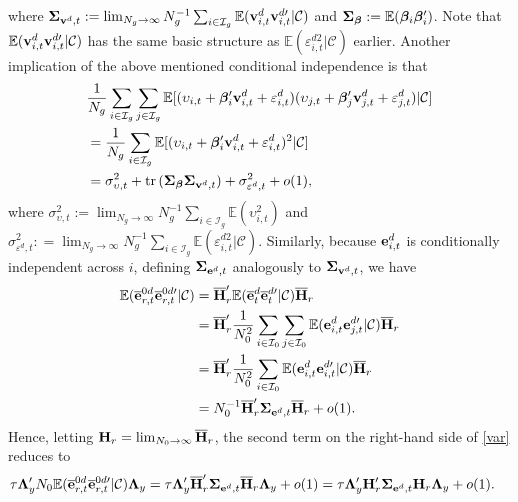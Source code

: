 \documentclass[12pt,fleqn]{article}
\begin{document}
where $\boldsymbol{\Sigma}_{\mathbf{v}^d,t} := \lim_{N_g\to\infty}N_g^{-1}\sum_{i\in \mathcal{I}_g}\mathbb{E}  (\mathbf{v}_{i,t}^d\mathbf{v}_{i,t}^{d\prime} |\mathcal{C} )$ and $\boldsymbol{\Sigma}_{\boldsymbol{\beta}} := \mathbb{E} ( \boldsymbol{\beta}_i\boldsymbol{\beta}_i' )$. Note that $\mathbb{E}  (\mathbf{v}_{i,t}^d\mathbf{v}_{i,t}^{d\prime} |\mathcal{C} )$ has the same basic structure as $\mathbb{E}  (\varepsilon_{i,t}^{d2} |\mathcal{C} )$ earlier. Another implication of the above mentioned conditional independence is that
\begin{align}
& \frac{1}{N_g}\sum_{i\in \mathcal{I}_g}\sum_{j\in \mathcal{I}_g}\mathbb{E} [ (\upsilon_{i,t}  + \boldsymbol{\beta}_i'\mathbf{v}_{i,t}^d + \varepsilon_{i,t}^d )(\upsilon_{j,t}  + \boldsymbol{\beta}_j'\mathbf{v}_{j,t}^d + \varepsilon_{j,t}^d )  |\mathcal{C} ]  \notag\\
&= \frac{1}{N_g}\sum_{i\in \mathcal{I}_g} \mathbb{E} [ (\upsilon_{i,t}  + \boldsymbol{\beta}_i'\mathbf{v}_{i,t}^d + \varepsilon_{i,t}^d )^2  |\mathcal{C} ]  \notag\\
&=  \sigma^2_{\upsilon,t}  + \mathrm{tr}\,(\boldsymbol{\Sigma}_{\boldsymbol{\beta}} \boldsymbol{\Sigma}_{\mathbf{v}^d,t}) + \sigma^2_{\varepsilon^d,t} + o(1),
\end{align}
where $\sigma^2_{\upsilon,t} :=  \lim_{N_g\to\infty}N_g^{-1}\sum_{i\in \mathcal{I}_g} \mathbb{E}  (\upsilon_{i,t}^2 )$ and $\sigma^2_{\varepsilon^d,t} : = \lim_{N_g\to\infty}N_g^{-1}\sum_{i\in \mathcal{I}_g} \mathbb{E}  (\varepsilon_{i,t}^{d2} |\mathcal{C} )$. Similarly, because $\mathbf{e}_{i,t}^{d}$ is conditionally independent across $i$, defining $\boldsymbol{\Sigma}_{\mathbf{e}^d,t}$ analogously to $\boldsymbol{\Sigma}_{\mathbf{v}^d,t}$, we have
\begin{align}
\mathbb{E}(\overline{\mathbf{e}}_{r,t}^{0d}\overline{\mathbf{e}}_{r,t}^{0d\prime} |\mathcal{C}) & = \overline{\mathbf{H}}_r'\mathbb{E}(\overline{\mathbf{e}}_{t}^{d}\overline{\mathbf{e}}_{t}^{d\prime} |\mathcal{C})\overline{\mathbf{H}}_r \notag\\
& = \overline{\mathbf{H}}_r'\frac{1}{N_0^2}\sum_{i\in \mathcal{I}_0}\sum_{j\in \mathcal{I}_0} \mathbb{E}(\mathbf{e}_{i,t}^{d}\mathbf{e}_{j,t}^{d\prime} |\mathcal{C})\overline{\mathbf{H}}_r \notag\\
& = \overline{\mathbf{H}}_r'\frac{1}{N_0^2}\sum_{i\in \mathcal{I}_0} \mathbb{E}(\mathbf{e}_{i,t}^{d}\mathbf{e}_{i,t}^{d\prime} |\mathcal{C})\overline{\mathbf{H}}_r \notag\\
& = N_0^{-1} \overline{\mathbf{H}}_r'  \boldsymbol{\Sigma}_{\mathbf{e}^d,t} \overline{\mathbf{H}}_r + o(1).
\end{align}
Hence, letting $\mathbf{H}_r = \lim_{N_0\to\infty} \overline{\mathbf{H}}_r$, the second term on the right-hand side of \eqref{var} reduces to
\begin{align}
\tau \boldsymbol{\Lambda}_y' N_0\mathbb{E}(\overline{\mathbf{e}}_{r,t}^{0d}\overline{\mathbf{e}}_{r,t}^{0d\prime} |\mathcal{C}) \boldsymbol{\Lambda}_y &= \tau \boldsymbol{\Lambda}_y' \overline{\mathbf{H}}_r'  \boldsymbol{\Sigma}_{\mathbf{e}^d,t} \overline{\mathbf{H}}_r \boldsymbol{\Lambda}_y + o(1)  = \tau  \boldsymbol{\Lambda}_y' \mathbf{H}_r'  \boldsymbol{\Sigma}_{\mathbf{e}^d,t} \mathbf{H}_r \boldsymbol{\Lambda}_y + o(1).
\end{align}
\end{document}
